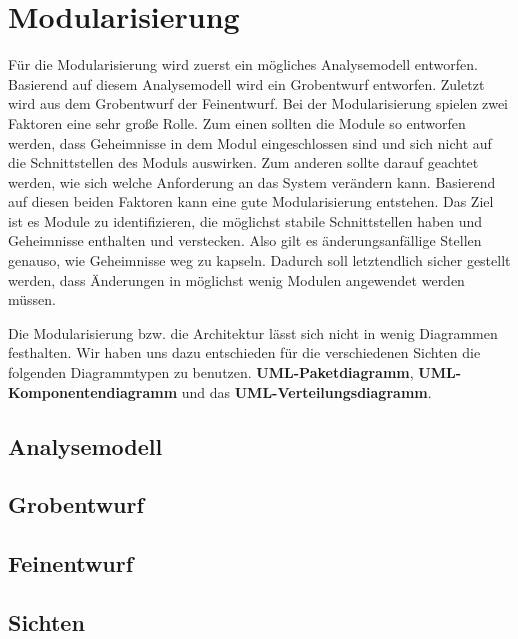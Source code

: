 
\clearpage

\section{Modularisierung}
Für die Modularisierung wird zuerst ein mögliches Analysemodell entworfen. Basierend auf diesem Analysemodell wird ein Grobentwurf entworfen. Zuletzt wird aus dem Grobentwurf der Feinentwurf. Bei der Modularisierung spielen zwei Faktoren eine sehr große Rolle. Zum einen sollten die Module so entworfen werden, dass Geheimnisse in dem Modul eingeschlossen sind und sich nicht auf die Schnittstellen des Moduls auswirken. Zum anderen sollte darauf geachtet werden, wie sich welche Anforderung an das System verändern kann. Basierend auf diesen beiden Faktoren kann eine gute Modularisierung entstehen. Das Ziel ist es Module zu identifizieren, die möglichst stabile Schnittstellen haben und Geheimnisse enthalten und verstecken. Also gilt es änderungsanfällige Stellen genauso, wie Geheimnisse weg zu kapseln. Dadurch soll letztendlich sicher gestellt werden, dass Änderungen in möglichst wenig Modulen angewendet werden müssen. 

\vspace{6pt}

Die Modularisierung bzw. die Architektur lässt sich nicht in wenig Diagrammen festhalten. Wir haben uns dazu entschieden für die verschiedenen Sichten die folgenden Diagrammtypen zu benutzen. \textbf{UML-Paketdiagramm}, \textbf{UML-Komponentendiagramm} und das \textbf{UML-Verteilungsdiagramm}.

\subsection{Analysemodell}

\subsection{Grobentwurf}

\subsection{Feinentwurf}

\subsection{Sichten}